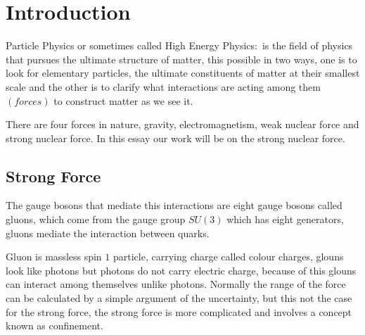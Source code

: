 \chapter{Introduction}
Particle Physics or sometimes called High Energy Physics$:$
is the field of physics that pursues the ultimate structure of matter, this
possible in two ways, one is to look for elementary particles, the ultimate constituents of matter at their smallest scale and the other is to clarify what interactions are acting among them
$(forces)$
to construct matter as we see it.
 
There are four forces in nature, gravity, electromagnetism, weak nuclear force and strong nuclear force. In this essay our work will be on the strong nuclear force. 

\section{Strong Force}
The gauge bosons that mediate this interactions
are eight gauge bosons called gluons, which come from the gauge group $SU(3)$ which has eight generators, gluons mediate the interaction between quarks.



Gluon is massless spin $1$ particle, carrying charge called colour charges,
glouns
look like photons but photons do not carry electric charge,
because of this glouns can interact among themselves unlike photons.
Normally the range of the force can be calculated by a
simple argument of the uncertainty,
but this not the case for the strong force, the strong force is more complicated
and involves a concept known as confinement.

